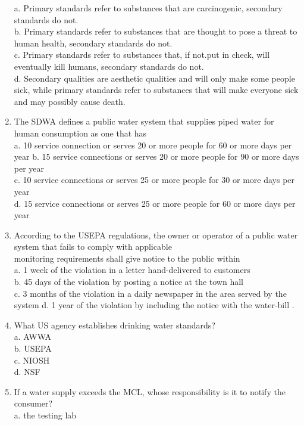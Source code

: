 \begin{enumerate}
a. Primary standards refer to substances that are carcinogenic, secondary standards do not.\\
b. Primary standards refer to substances that are thought to pose a threat to human health, secondary standards do not.\\
c. Primary standards refer to substances that, if not.put in check, will eventually kill humans, secondary standards do not.\\
d. Secondary qualities are aesthetic qualities and will only make some people sick, while primary standards refer to substances that will make everyone sick and may possibly cause death.\\
\item The SDWA defines a public water system that supplies piped water for human consumption as one that has\\
a. 10 service connection or serves 20 or more people for 60 or more days per year b. 15 service connections or serves 20 or more people for 90 or more days per year\\
c. 10 service connections or serves 25 or more people for 30 or more days per year\\
d. 15 service connections or serves 25 or more people for 60 or more days per year\\
\item According to the USEPA regulations, the owner or operator of a public water system that fails to comply with applicable\\
monitoring requirements shall give notice to the public within\\
a. 1 week of the violation in a letter hand-delivered to customers\\
b. 45 days of the violation by posting a notice at the town hall\\
c. 3 months of the violation in a daily newspaper in the area served by the system d. 1 year of the violation by including the notice with the water-bill .\\
\item What US agency establishes drinking water standards?\\
a. AWWA\\
b. USEPA\\
c. NIOSH\\
d. NSF\\
\item If a water supply exceeds the MCL, whose responsibility is it to notify the consumer?\\
a. the testing lab\\

\end{enumerate}

